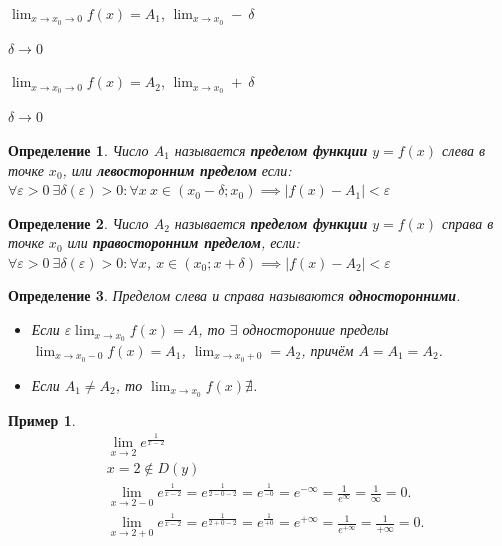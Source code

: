 \documentclass[12pt, a4paper]{article}
\newtheorem{definition}{Определение}[subsection]
\newtheorem{example}{Пример}[subsection]
\theoremstyle{remark}
\newcommand{\Y}{\mathbb{\forall}}
\newcommand{\F}{\mathbb{\exists}}
\newcommand{\E}{\mathbb{\varepsilon}}
\begin{document}
	\noindent $\lim_{x \to x_0 \to 0} f(x) = A_1$, $\lim_{x \to x_0} - \ \delta$ 
	
	\hspace{4.5cm} $\delta \to 0$ 
	\vspace{0.4cm}
	
	\noindent $\lim_{x \to x_0 \to 0} f(x) = A_2$, $\lim_{x \to x_0} + \ \delta$ 
	
	\hspace{4.5cm} $\delta \to 0$ 
	
	\begin{definition}
		Число $A_1$ называется \textbf{пределом функции} $y = f(x)$ слева в точке $x_0$, или \textbf{левосторонним пределом} если: \\ $\Y\E > 0 \ \F\delta(\E) > 0: \Y x \ x \in (x_0 - \delta; x_0) \implies |f(x) - A_1| < \E$
	\end{definition}
	
	\begin{definition}
		Число $A_2$ называется \textbf{пределом функции} $y = f(x)$ справа в точке $x_0$ или \textbf{правосторонним пределом}, если: \\ $\Y\E > 0 \ \F\delta(\E) > 0: \Y x$, $x \in (x_0; x + \delta) \implies |f(x) - A_2| < \E$
	\end{definition}
	
	\begin{definition}
		Пределом слева и справа называются \textbf{односторонними}. 
		\begin{itemize}
			\item Если $\E \lim_{x \to x_0} f(x) = A$, то $\F$ односторониие пределы $\lim_{x \to x_0 - 0} f(x) = A_1$, $\lim_{x \to x_0 + 0} = A_2$, причём $A = A_1 = A_2$.
			
			\item Если $A_1 \neq A_2$, то $\lim_{x \to x_0} f(x) \nexists$.
		\end{itemize}
	\end{definition}
	
	\begin{example}
		\begin{align*}
			&\lim_{x \to 2} e^{\frac{1}{x - 2}} \\
			&x = 2 \notin D(y) \\
			&\lim_{x \to 2 - 0} e^{\frac{1}{x - 2}} = e^{\frac{1}{2 - 0 - 2}} = e^{\frac{1}{-0}} = e^{-\infty} = \frac{1}{e^\infty} = \frac{1}{\infty} = 0. \\ 
			&\lim_{x \to 2 + 0} e^\frac{1}{x - 2} = e^{\frac{1}{2 + 0 - 2}} = e^\frac{1}{+0} = e^{+\infty} = \frac{1}{e^{+\infty}} = \frac{1}{+\infty} = 0.
		\end{align*}
	\end{example}
	
\end{document}
